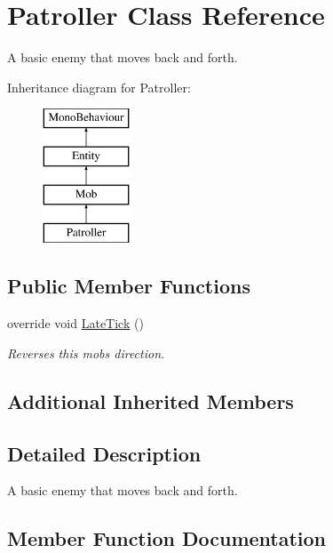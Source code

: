 \hypertarget{class_patroller}{}\section{Patroller Class Reference}
\label{class_patroller}


A basic enemy that moves back and forth.  


Inheritance diagram for Patroller\+:\begin{figure}[H]
\begin{center}
\leavevmode
\includegraphics[height=4.000000cm]{class_patroller}
\end{center}
\end{figure}
\subsection*{Public Member Functions}
\begin{DoxyCompactItemize}
\item 
override void \mbox{\hyperlink{class_patroller_a72fbde4c18c8b857a43e63ed5b830f53}{Late\+Tick}} ()
\begin{DoxyCompactList}\small\item\em Reverses this mob\textquotesingle{}s direction. \end{DoxyCompactList}\end{DoxyCompactItemize}
\subsection*{Additional Inherited Members}


\subsection{Detailed Description}
A basic enemy that moves back and forth. 



\subsection{Member Function Documentation}
\mbox{\label{class_patroller_a72fbde4c18c8b857a43e63ed5b830f53}} 
